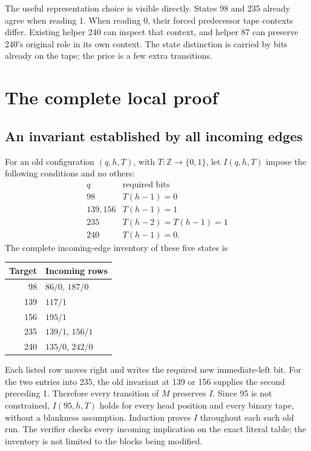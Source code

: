 \documentclass[11pt]{article}
\begin{document}
The useful representation choice is visible directly.  States 98 and 235
already agree when reading 1.  When reading 0, their forced predecessor
tape contexts differ.  Existing helper 240 can inspect that context, and
helper 87 can preserve 240's original role in its own context.  The state
distinction is carried by bits already on the tape; the price is a few
extra transitions.

\section{The complete local proof}

\subsection{An invariant established by all incoming edges}

For an old configuration $(q,h,T)$, with $T:\mathbb Z\to\{0,1\}$,
let $I(q,h,T)$ impose the following conditions and no others:
\[
\begin{array}{c|l}
q&\text{required bits}\\\hline
98&T(h-1)=0\\
139,156&T(h-1)=1\\
235&T(h-2)=T(h-1)=1\\
240&T(h-1)=0.
\end{array}
\]
The complete incoming-edge inventory of these five states is
\begin{center}
\begin{tabular}{rl}
\toprule
Target & Incoming rows\\\midrule
98 & $86/0$, $187/0$\\
139 & $117/1$\\
156 & $195/1$\\
235 & $139/1$, $156/1$\\
240 & $135/0$, $242/0$\\
\bottomrule
\end{tabular}
\end{center}

Each listed row moves right and writes the required new immediate-left
bit.  For the two entries into 235, the old invariant at 139 or 156
supplies the second preceding 1.  Therefore every transition of $M$
preserves $I$.  Since 95 is not constrained, $I(95,h,T)$ holds for every
head position and every binary tape, without a blankness assumption.
Induction proves $I$ throughout each such old run.  The verifier checks
every incoming implication on the exact literal table; the inventory is
not limited to the blocks being modified.
\end{document}
